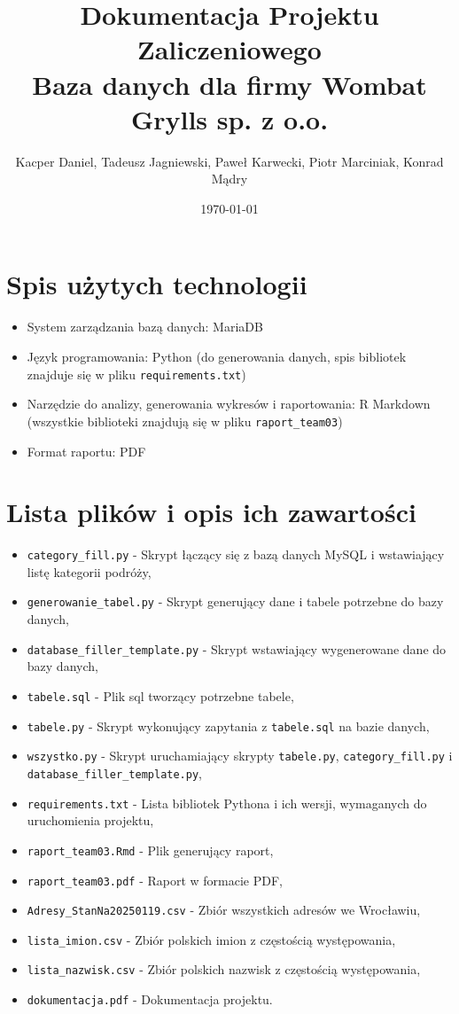 \documentclass{article}
\title{Dokumentacja Projektu Zaliczeniowego\\ \huge Baza danych dla firmy Wombat Grylls sp. z o.o.}
\author{Kacper Daniel, Tadeusz Jagniewski, Paweł Karwecki, Piotr Marciniak, Konrad Mądry}
\date{\today}
\begin{document}
\maketitle

\newpage

\tableofcontents
\newpage

\section{Spis użytych technologii}
\begin{itemize}
    \item System zarządzania bazą danych: MariaDB
    \item Język programowania: Python (do generowania danych, spis bibliotek znajduje się w 
pliku \texttt{requirements.txt})
    \item Narzędzie do analizy, generowania wykresów i raportowania: R Markdown (wszystkie
biblioteki znajdują się w pliku \texttt{raport\_team03})
    \item Format raportu: PDF
\end{itemize}

\section{Lista plików i opis ich zawartości}
\begin{itemize}
    \item \texttt{category\_fill.py} - Skrypt łączący się z bazą danych MySQL i wstawiający listę kategorii podróży,
    \item \texttt{generowanie\_tabel.py} - Skrypt generujący dane i tabele potrzebne do bazy danych,
    \item \texttt{database\_filler\_template.py} - Skrypt wstawiający wygenerowane dane do bazy danych,
    \item \texttt{tabele.sql} - Plik sql tworzący potrzebne tabele,
    \item \texttt{tabele.py} - Skrypt wykonujący zapytania z \texttt{tabele.sql} na bazie danych,
    \item \texttt{wszystko.py} - Skrypt uruchamiający skrypty \texttt{tabele.py}, \texttt{category\_fill.py} i \texttt{database\_filler\_template.py},
    \item \texttt{requirements.txt} - Lista bibliotek Pythona i ich wersji, wymaganych do uruchomienia projektu,
    \item \texttt{raport\_team03.Rmd} - Plik generujący raport,
    \item \texttt{raport\_team03.pdf} - Raport w formacie PDF,
    \item \texttt{Adresy\_StanNa20250119.csv} - Zbiór wszystkich adresów we Wrocławiu,
    \item \texttt{lista\_imion.csv} - Zbiór polskich imion z częstością występowania,
    \item \texttt{lista\_nazwisk.csv} - Zbiór polskich nazwisk z częstością występowania,
    \item \texttt{dokumentacja.pdf} - Dokumentacja projektu.
\end{itemize}
\end{document}
